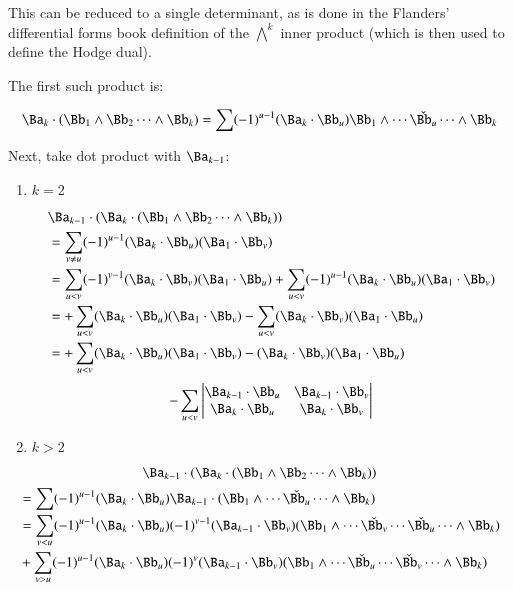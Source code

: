 This can be reduced to a single determinant, as is done in
the Flanders' differential forms book definition of the 
${\bigwedge}^k$ inner product (which is then used to define the Hodge dual).

The first such product is:

\[
\Ba_k \cdot (\Bb_1 \wedge \Bb_2 \cdots \wedge \Bb_k)
= \sum (-1)^{u-1} (\Ba_k \cdot \Bb_u) \Bb_1 \wedge \cdots \check{\Bb_u} \cdots \wedge \Bb_k
\]

Next, take dot product with $\Ba_{k-1}$:

\begin{enumerate}
\item $k = 2$

\begin{align*}
&\Ba_{k-1} \cdot (\Ba_k \cdot (\Bb_1 \wedge \Bb_2 \cdots \wedge \Bb_k)) \\
&= \sum_{v \ne u} (-1)^{u-1} (\Ba_k \cdot \Bb_u) (\Ba_1 \cdot \Bb_v) \\
&= 
 \sum_{u < v} (-1)^{v-1} (\Ba_k \cdot \Bb_v) (\Ba_1 \cdot \Bb_u) 
+\sum_{u < v} (-1)^{u-1} (\Ba_k \cdot \Bb_u) (\Ba_1 \cdot \Bb_v) \\
&= 
+\sum_{u < v} (\Ba_k \cdot \Bb_u) (\Ba_1 \cdot \Bb_v) 
-\sum_{u < v} (\Ba_k \cdot \Bb_v) (\Ba_1 \cdot \Bb_u) \\
&= 
+\sum_{u< v} (\Ba_k \cdot \Bb_u) (\Ba_1 \cdot \Bb_v) 
- (\Ba_k \cdot \Bb_v) (\Ba_1 \cdot \Bb_u) \\
\end{align*}
\begin{equation}\label{eqn:bladegradereduction:k2dot}
-\sum_{u< v}
\begin{vmatrix}
\Ba_{k-1} \cdot \Bb_u & \Ba_{k-1} \cdot \Bb_v \\
\Ba_k \cdot \Bb_u & \Ba_k \cdot \Bb_v \\
\end{vmatrix}
\end{equation}

\item $k>2$
\end{enumerate}

\[
\Ba_{k-1} \cdot (\Ba_k \cdot (\Bb_1 \wedge \Bb_2 \cdots \wedge \Bb_k))
\]
\begin{align*}
&= \sum (-1)^{u-1} (\Ba_k \cdot \Bb_u) \Ba_{k-1} \cdot (\Bb_1 \wedge \cdots \check{\Bb_u} \cdots \wedge \Bb_k) \\
&= \sum_{v<u} (-1)^{u-1} (\Ba_k \cdot \Bb_u) (-1)^{v-1} (\Ba_{k-1} \cdot \Bb_v) (\Bb_1 \wedge \cdots \check{\Bb_v} \cdots \check{\Bb_u} \cdots \wedge \Bb_k) \\
&+ \sum_{v>u} (-1)^{u-1} (\Ba_k \cdot \Bb_u) (-1)^{v} (\Ba_{k-1} \cdot \Bb_v) (\Bb_1 \wedge \cdots \check{\Bb_u} \cdots \check{\Bb_v} \cdots \wedge \Bb_k) \\
\end{align*}

